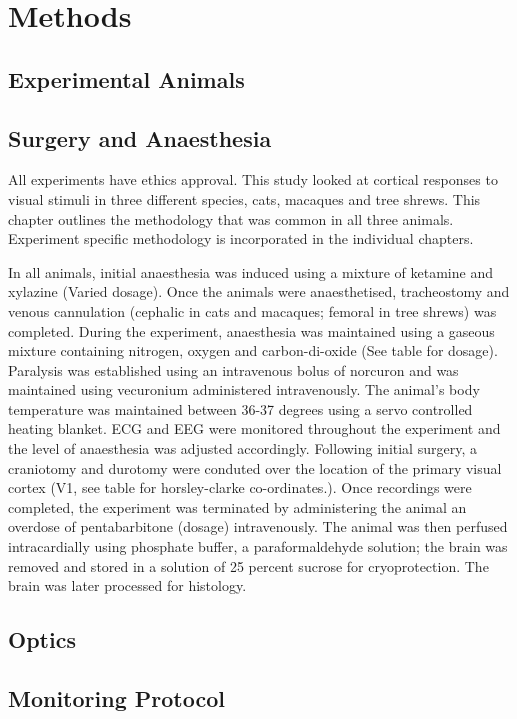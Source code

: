 \chapter{Methods}

\section{Experimental Animals}
\section{Surgery and Anaesthesia}

	All experiments have ethics approval. This study looked at cortical responses to visual stimuli in three different species, cats, macaques and tree shrews. This chapter outlines the methodology that was common in all three animals. Experiment specific methodology is incorporated in the individual chapters.

	In all animals, initial anaesthesia was induced using a mixture of ketamine and xylazine (Varied dosage). Once the animals were anaesthetised, tracheostomy and venous cannulation (cephalic in cats and macaques; femoral in tree shrews) was completed. During the experiment, anaesthesia was maintained using a gaseous mixture containing nitrogen, oxygen and carbon-di-oxide (See table for dosage). Paralysis was established using an intravenous bolus of norcuron and was maintained using vecuronium administered intravenously. The animal's body temperature was maintained between 36-37 degrees using a servo controlled heating blanket. ECG and EEG were monitored throughout the experiment and the level of anaesthesia was adjusted accordingly. Following initial surgery, a craniotomy and durotomy were conduted over the location of the primary visual cortex (V1, see table for horsley-clarke co-ordinates.). Once recordings were completed, the experiment was terminated by administering the animal an overdose of pentabarbitone (dosage) intravenously. The animal was then perfused intracardially using phosphate buffer, a paraformaldehyde solution; the brain was removed and stored in a solution of 25 percent sucrose for cryoprotection. The brain was later processed for histology.

\section{Optics}

\section{Monitoring Protocol}

